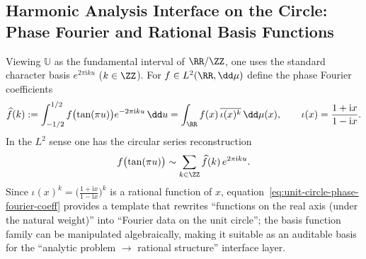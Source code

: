 \subsection{Harmonic Analysis Interface on the Circle: Phase Fourier and Rational Basis Functions}\label{subsec:unit-circle-phase-fourier}
Viewing \(\mathbb{U}\) as the fundamental interval of \(\RR/\ZZ\), one uses the standard character basis \(e^{2\pi\mathrm{i}ku}\) (\(k\in\ZZ\)).
For \(f\in L^2(\RR,\dd\mu)\) define the phase Fourier coefficients
\begin{equation}\label{eq:unit-circle-phase-fourier-coeff}
\widehat f(k)
:=\int_{-1/2}^{1/2} f\bigl(\tan(\pi u)\bigr)e^{-2\pi\mathrm{i}ku}\,\dd u
=\int_{\RR} f(x)\,\overline{\iota(x)^k}\,\dd\mu(x),
\qquad
\iota(x)=\frac{1+\mathrm{i}x}{1-\mathrm{i}x}.
\end{equation}
In the \(L^2\) sense one has the circular series reconstruction
\begin{equation}\label{eq:unit-circle-phase-fourier-reconstruct}
f\bigl(\tan(\pi u)\bigr)\sim \sum_{k\in\ZZ}\widehat f(k)\,e^{2\pi\mathrm{i}ku}.
\end{equation}
Since
\(
\iota(x)^k=\bigl(\tfrac{1+\mathrm{i}x}{1-\mathrm{i}x}\bigr)^k
\)
is a rational function of \(x\), equation~\eqref{eq:unit-circle-phase-fourier-coeff} provides a template that rewrites ``functions on the real axis (under the natural weight)'' into ``Fourier data on the unit circle''; the basis function family can be manipulated algebraically, making it suitable as an auditable basis for the ``analytic problem \(\to\) rational structure'' interface layer.

